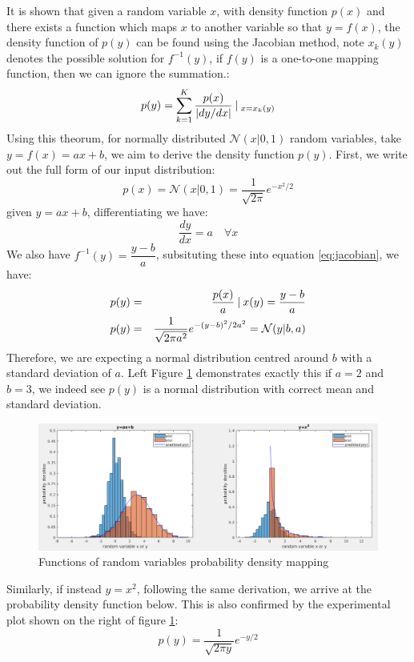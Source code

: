 \documentclass{article}
\begin{document}
It is shown that given a random variable $x$, with density function $p(x)$ and there exists a function which maps $x$ to another variable so that $y=f(x)$, the density function of $p(y)$ can be found using the Jacobian method, note $x_k(y)$ denotes the possible solution for $f^{-1}(y)$, if $f(y)$ is a one-to-one mapping function, then we can ignore the summation.:
\begin{equation}
p(y) = \sum_{k=1}^{K}\dfrac{p(x)}{|dy/dx|} \:\vert\: _{x=x_k(y)}
\label{eq:jacobian}
\end{equation}
Using this theorum, for normally distributed $\mathcal{N}(x|0,1)$ random variables, take $y=f(x)=ax+b$, we aim to derive the density function $p(y)$. First, we write out the full form of our input distribution:
\begin{equation}
	p(x) = \mathcal{N}(x|0,1) = \dfrac{1}{\sqrt{2\pi}}e^{-x^2/2}
\end{equation}
given $y=ax+b$, differentiating we have:
\begin{equation}
\dfrac{dy}{dx} = a \quad \forall x
\end{equation}
We also have $f^{-1}(y)=\dfrac{y-b}{a}$, subsituting these into equation \ref{eq:jacobian}, we have:
\begin{eqnarray}
	p(y)&=&\dfrac{p(x)}{a}\:\vert\: x(y)=\dfrac{y-b}{a}\\
	p(y) &=& \dfrac{1}{\sqrt{2\pi a^2}}e^{-{(y-b)^2/2a^2}} = \mathcal{N}(y|b,a)
\end{eqnarray}
Therefore, we are expecting a normal distribution centred around $b$ with a standard deviation of $a$. Left Figure \ref{fig:jacobian} demonstrates exactly this if $a=2$ and $b=3$, we indeed see $p(y)$ is a normal distribution with correct mean and standard deviation.\\

\begin{figure}[htp]
	\centering
	\includegraphics[width=0.9\linewidth]{task_2.png}
	\caption{Functions of random variables probability density mapping}
	\label{fig:jacobian}
\end{figure}
Similarly, if instead $y=x^2$, following the same derivation, we arrive at the probability density function below. This is also confirmed by the experimental plot shown on the right of figure \ref{fig:jacobian}:
\begin{equation}
	p(y)=\dfrac{1}{\sqrt{2\pi y}}e^{-y/2}
\end{equation}
\end{document}
